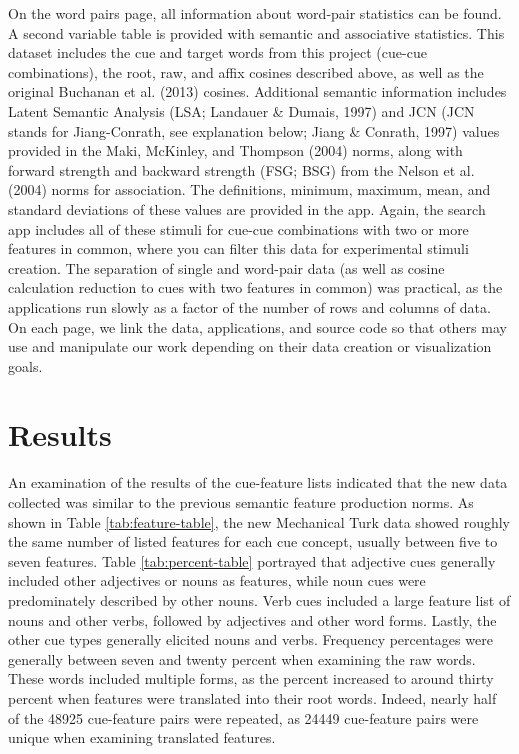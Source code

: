 \documentclass[english,,man]{apa6}
\theoremstyle{definition}
\theoremstyle{definition}
\theoremstyle{definition}
\theoremstyle{remark}
\begin{document}
On the word pairs page, all information about word-pair statistics can
be found. A second variable table is provided with semantic and
associative statistics. This dataset includes the cue and target words
from this project (cue-cue combinations), the root, raw, and affix
cosines described above, as well as the original Buchanan et al. (2013)
cosines. Additional semantic information includes Latent Semantic
Analysis (LSA; Landauer \& Dumais, 1997) and JCN (JCN stands for
Jiang-Conrath, see explanation below; Jiang \& Conrath, 1997) values
provided in the Maki, McKinley, and Thompson (2004) norms, along with
forward strength and backward strength (FSG; BSG) from the Nelson et al.
(2004) norms for association. The definitions, minimum, maximum, mean,
and standard deviations of these values are provided in the app. Again,
the search app includes all of these stimuli for cue-cue combinations
with two or more features in common, where you can filter this data for
experimental stimuli creation. The separation of single and word-pair
data (as well as cosine calculation reduction to cues with two features
in common) was practical, as the applications run slowly as a factor of
the number of rows and columns of data. On each page, we link the data,
applications, and source code so that others may use and manipulate our
work depending on their data creation or visualization goals.

\hypertarget{results}{%
\section{Results}\label{results}}

An examination of the results of the cue-feature lists indicated that
the new data collected was similar to the previous semantic feature
production norms. As shown in Table \ref{tab:feature-table}, the new
Mechanical Turk data showed roughly the same number of listed features
for each cue concept, usually between five to seven features. Table
\ref{tab:percent-table} portrayed that adjective cues generally included
other adjectives or nouns as features, while noun cues were
predominately described by other nouns. Verb cues included a large
feature list of nouns and other verbs, followed by adjectives and other
word forms. Lastly, the other cue types generally elicited nouns and
verbs. Frequency percentages were generally between seven and twenty
percent when examining the raw words. These words included multiple
forms, as the percent increased to around thirty percent when features
were translated into their root words. Indeed, nearly half of the 48925
cue-feature pairs were repeated, as 24449 cue-feature pairs were unique
when examining translated features.
\end{document}
